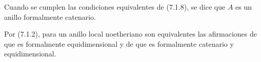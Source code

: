 \begin{definition}[7.1.9]
\label{IV.2.s7.1.9-fr}
Cuando se cumplen las condiciones equivalentes de
\textup{(7.1.8)}, se dice que $A$ es un anillo
formalmente catenario.
\end{definition}

Por (7.1.2), para un anillo local noetheriano son
equivalentes las afirmaciones de que es formalmente
equidimensional y de que es formalmente catenario
y equidimensional.
